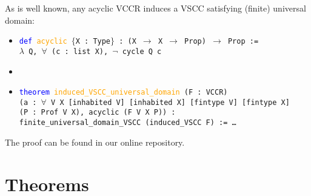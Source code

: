 \documentclass[runningheads]{llncs}
\begin{document}
As is well known, any acyclic VCCR induces a VSCC satisfying (finite) universal domain:
\begin{itemize}
\item[] \texttt{\textcolor{blue}{def} \textcolor{orange}{acyclic} $\{$X : Type$\}$ : (X $\to$ X $\to$ Prop) $\to$ Prop :=}\\
\texttt{$\lambda$ Q, $\forall$ (c : list X), $\neg$ cycle Q c}
\item[]
\item[] \texttt{\textcolor{blue}{theorem} \textcolor{orange}{induced\_VSCC\_universal\_domain} (F : VCCR)}\\
\texttt{(a : $\forall$ V X [inhabited V] [inhabited X] [fintype V] [fintype X]} \\
\texttt{(P : Prof V X), acyclic (F V X P)) :}\\
\texttt{finite\_universal\_domain\_VSCC (induced\_VSCC F) := \dots}
\end{itemize}
The proof can be found in our online repository.





\begin{comment}
\whnote{Let's think about how to formalize the following...}

\begin{definition} \textnormal{Given $X\subseteq\mathcal{X}$, a \textit{choice function on $X$} is a function that assigns to each nonempty $Y\subseteq X$ a nonempty $C(Y)\subseteq Y$.}
\end{definition}

\begin{definition}\textnormal{For $V\subseteq\mathcal{V}$ and $X\subseteq\mathcal{X}$, a \textit{functional collective choice rule for $(V,X)$}, or \textit{$(V,X)$-FCCR}, is a function $\mathbb{F}$ that assigns to each $\mathbf{Q}\in  \mathsf{Prof}(V,X)$ a choice function on $X$.}\end{definition}

\begin{definition}\label{VCCR} \textnormal{A \emph{variable-election functional collective choice rule} (VFCCR) is a function $f$ that assigns to each pair $(V,X)$ of a $V\subseteq\mathcal{V}$ and $X\subseteq\mathcal{X}$ a $(V,X)$-FCCR.}%
\end{definition}
\end{comment}

\section{Theorems}\label{Theorems}
\end{document}
